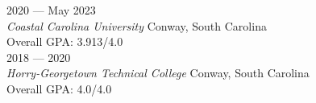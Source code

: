 
	\hfill 2020 --- May 2023 \\
\textit{Coastal Carolina University}    \hfill Conway, South Carolina \\ 
Overall GPA: 3.913/4.0 \\
   \hfill	2018 --- 2020 \\ 
\textit{Horry-Georgetown Technical College} \hfill Conway, South Carolina \\ 
Overall GPA: 4.0/4.0 \\

